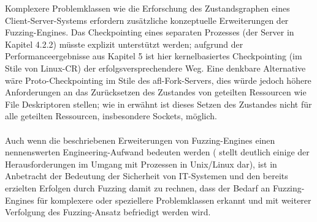 \documentclass[a4paper]{article}
\begin{document}
Komplexere Problemklassen wie die Erforschung des Zustandsgraphen eines Client-Server-Systems erfordern zusätzliche konzeptuelle Erweiterungen der Fuzzing-Engines.
Das Checkpointing eines separaten Prozesses (der Server in Kapitel 4.2.2) müsste explizit unterstützt werden; aufgrund der Performanceergebnisse aus Kapitel 5 ist hier kernelbasiertes Checkpointing (im Stile von Linux-CR) der erfolgsversprechendere Weg.
Eine denkbare Alternative wäre Proto-Checkpointing im Stile des afl-Fork-Servers, dies würde jedoch höhere Anforderungen an das Zurücksetzen des Zustandes von geteilten Ressourcen wie File Deskriptoren stellen; wie in \cite{aflrestore} erwähnt ist dieses Setzen des Zustandes nicht für alle geteilten Ressourcen, insbesondere Sockets, möglich.\\ \\

Auch wenn die beschriebenen Erweiterungen von Fuzzing-Engines einen nennenswerten Engineering-Aufwand bedeuten werden (\cite{aflrestore} stellt deutlich einige der Herausforderungen im Umgang mit Prozessen in Unix/Linux dar), ist in Anbetracht der Bedeutung der Sicherheit von IT-Systemen und den bereits erzielten Erfolgen durch Fuzzing damit zu rechnen, dass der Bedarf an Fuzzing-Engines für komplexere oder speziellere Problemklassen erkannt und mit weiterer Verfolgung des Fuzzing-Ansatz befriedigt werden wird.

\newpage


\nocite{*}
\end{document}
